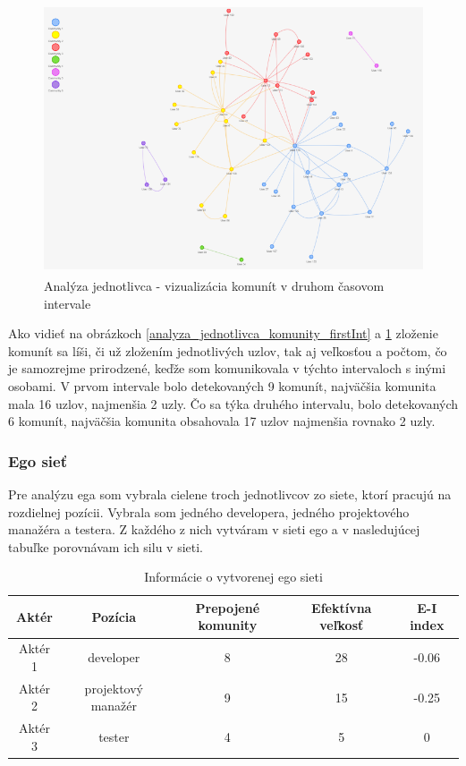 \documentclass[slovak,master,public,dept460,male,cpdeclaration,oneside]{diploma}
\begin{document}
\begin{figure}[H]
\centering
\includegraphics[width=12cm, height=8cm]{figures/analyza_jednotlivca_komunity_secondInt}
\caption{Analýza jednotlivca - vizualizácia komunít v druhom časovom intervale}
\label{analyza_jednotlivca_komunity_secondInt}
\end{figure}

Ako vidieť na obrázkoch \ref{analyza_jednotlivca_komunity_firstInt} a \ref{analyza_jednotlivca_komunity_secondInt} zloženie komunít sa líši, či už zložením jednotlivých uzlov, tak aj veľkosťou a počtom, čo je samozrejme prirodzené, keďže som komunikovala v týchto intervaloch s inými osobami. V prvom intervale bolo detekovaných 9 komunít, najväčšia komunita mala 16 uzlov, najmenšia 2 uzly. Čo sa týka druhého intervalu, bolo detekovaných 6 komunít, najväčšia komunita obsahovala 17 uzlov najmenšia rovnako 2 uzly.


\subsubsection{Ego sieť}
Pre analýzu ega som vybrala cielene troch jednotlivcov zo siete, ktorí pracujú na rozdielnej pozícii. Vybrala som jedného developera, jedného projektového manažéra a testera. Z každého z nich vytváram v sieti ego a v nasledujúcej tabuľke porovnávam ich silu v sieti.

\begin{table}[h!]
\centering
\begin{tabular}{ |c|c|c|c|c| }
 \hline
 Aktér & Pozícia & Prepojené komunity & Efektívna veľkosť & E-I index \\ 
 \hline
 Aktér 1  & developer  & 8  & 28  &  -0.06 \\  
  \hline
  Aktér 2 &  projektový manažér  &  9 & 15 & -0.25  \\ 
  \hline
  Aktér 3 & tester   &  4 &  5 & 0  \\ 
  \hline

\end{tabular}
\caption{Informácie o vytvorenej ego sieti}
\end{table} 
\end{document}
